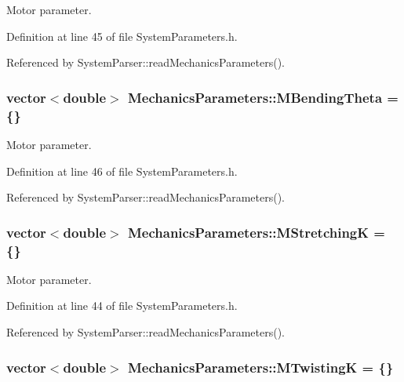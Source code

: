 Motor parameter. 



Definition at line 45 of file System\+Parameters.\+h.



Referenced by System\+Parser\+::read\+Mechanics\+Parameters().

\hypertarget{structMechanicsParameters_a597e2027d01d684f5dfe90d8a2734a90}{
\subsubsection[{M\+Bending\+Theta}]{\setlength{\rightskip}{0pt plus 5cm}vector$<$double$>$ Mechanics\+Parameters\+::\+M\+Bending\+Theta = \{\}}}\label{structMechanicsParameters_a597e2027d01d684f5dfe90d8a2734a90}


Motor parameter. 



Definition at line 46 of file System\+Parameters.\+h.



Referenced by System\+Parser\+::read\+Mechanics\+Parameters().

\hypertarget{structMechanicsParameters_a36650ee6fc8a98f94b6594e67d4b34f5}{
\subsubsection[{M\+Stretching\+K}]{\setlength{\rightskip}{0pt plus 5cm}vector$<$double$>$ Mechanics\+Parameters\+::\+M\+Stretching\+K = \{\}}}\label{structMechanicsParameters_a36650ee6fc8a98f94b6594e67d4b34f5}


Motor parameter. 



Definition at line 44 of file System\+Parameters.\+h.



Referenced by System\+Parser\+::read\+Mechanics\+Parameters().

\hypertarget{structMechanicsParameters_a3efad448cc6428dcb081d2778655ec12}{
\subsubsection[{M\+Twisting\+K}]{\setlength{\rightskip}{0pt plus 5cm}vector$<$double$>$ Mechanics\+Parameters\+::\+M\+Twisting\+K = \{\}}}\label{structMechanicsParameters_a3efad448cc6428dcb081d2778655ec12}


